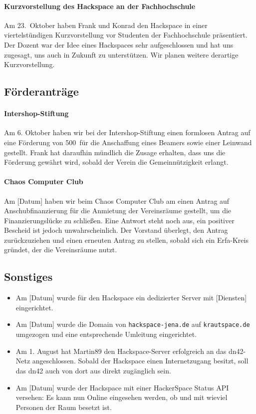 \documentclass[10pt,DIV16]{scrartcl}
\begin{document}
\paragraph{Kurzvorstellung des Hackspace an der Fachhochschule}

Am 23.~Oktober haben Frank und Konrad den Hackspace in einer viertelstündigen
Kurzvorstellung vor Studenten der Fachhochschule präsentiert.  Der Dozent war
der Idee eines Hackspaces sehr aufgeschlossen und hat uns zugesagt, uns auch
in Zukunft zu unterstützen.  Wir planen weitere derartige Kurzvorstellung.

\subsection{Förderanträge}

\paragraph{Intershop-Stiftung}

Am 6. Oktober haben wir bei der Intershop-Stiftung einen formlosen Antrag auf
eine Förderung von 500\EUR\ für die Anschaffung eines Beamers sowie einer
Leinwand gestellt.  Frank hat daraufhin mündlich die Zusage erhalten, dass uns
die Förderung gewährt wird, sobald der Verein die Gemeinnützigkeit erlangt.

\paragraph{Chaos Computer Club}

Am [Datum] haben wir beim Chaos Computer Club am einen Antrag auf
Anschubfinanzierung für die Anmietung der Vereinsräume gestellt, um die
Finanzierungslücke zu schließen.  Eine Antwort steht noch aus, ein positiver
Bescheid ist jedoch unwahrscheinlich.  Der Vorstand überlegt, den Antrag
zurückzuziehen und einen erneuten Antrag zu stellen, sobald sich ein
Erfa-Kreis gründet, der die Vereinsräume nutzt.

\subsection{Sonstiges}

\begin{itemize}
	\item
		Am [Datum] wurde für den Hackspace ein dedizierter Server mit
		[Diensten] eingerichtet.
	\item
		Am [Datum] wurde die Domain von \texttt{hackspace-jena.de} auf
		\texttt{krautspace.de} umgezogen und eine entsprechende Umleitung
		eingerichtet.
	\item
		Am 1. August hat Martin89 den Hackspace-Server erfolgreich an das
		dn42-Netz angeschlossen.  Sobald der Hackspace einen Internetzugang
		besitzt, soll das dn42 auch von dort aus direkt zugänglich sein.
	\item
		Am [Datum] wurde der Hackspace mit einer HackerSpace Status API
		versehen:  Es kann nun Online eingesehen werden, ob und mit wieviel
		Personen der Raum besetzt ist.
\end{itemize}
\end{document}
